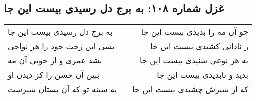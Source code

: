 \begin{center}
\section*{غزل شماره ۱۰۸: به برج دل رسیدی بیست این جا}
\label{sec:0108}
\begin{longtable}{l p{0.5cm} r}
به برج دل رسیدی بیست این جا
&&
چو آن مه را بدیدی بیست این جا
\\
بسی این رخت خود را هر نواحی
&&
ز نادانی کشیدی بیست این جا
\\
بشد عمری و از خوبی آن مه
&&
به هر نوعی شنیدی بیست این جا
\\
ببین آن حسن را کز دیدن او
&&
بدید و نابدیدی بیست این جا
\\
به سینه تو که آن پستان شیرست
&&
که از شیرش چشیدی بیست این جا
\\
\end{longtable}
\end{center}
